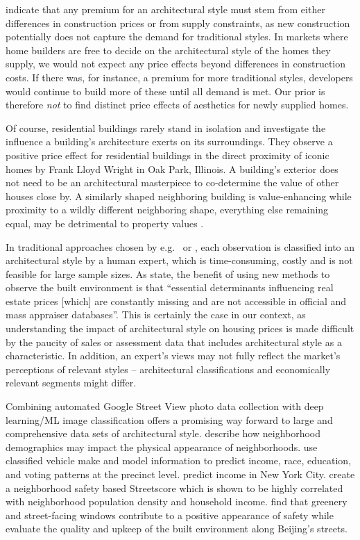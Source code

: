\documentclass[]{article}
\begin{document}
\textcite{Buitelaar2017} indicate that any premium for an architectural style must stem from either differences in construction prices or from supply
constraints, as new construction potentially does not capture the demand
for traditional styles. In markets where home builders are free to decide on the architectural style of the homes they supply, we would not expect any price effects beyond differences in construction costs. If there was, for instance, a premium for more traditional styles, developers would continue to build more of these until all demand is met. Our prior is therefore \emph{not} to find distinct price effects of aesthetics for newly supplied homes. 

Of course, residential buildings rarely stand in isolation and \textcite{Ahlfeldt2012} investigate the influence a building's architecture exerts on its surroundings. They observe a positive price effect for residential buildings in the direct proximity of iconic homes by Frank Lloyd Wright in Oak Park, Illinois. A building's exterior does not need to be an architectural masterpiece to co-determine the value of other houses close by. A similarly shaped neighboring building is value-enhancing while proximity to a wildly different neighboring shape, everything else remaining equal, may be detrimental to property values \autocite{Lindenthal2017b}. 

In traditional approaches chosen by e.g.~\textcite{Buitelaar2017} or \textcite{Ahlfeldt2012}, each observation is classified into an architectural style by a human expert, which is time-consuming, costly and is not feasible for large sample sizes. As \textcite{Helbich2013} state, the benefit of using new methods to observe the built environment is that ``essential determinants influencing real estate prices {[}which{]} are constantly missing and are not accessible in official and mass appraiser databases''. This is certainly the case in our context, as understanding the impact of architectural style on housing prices is made difficult by the paucity of sales or assessment data that includes architectural style as a characteristic. In addition, an expert's views may not fully reflect the market's perceptions of relevant styles -- architectural classifications and economically relevant segments might differ.

Combining automated Google Street View photo data collection with deep learning/ML image classification offers a promising way forward to large and comprehensive data sets of architectural style. \textcite{Naik2017} describe how neighborhood demographics may impact the physical appearance of neighborhoods. \textcite{Gebru2017} use classified vehicle make and model information to predict income, race, education, and voting patterns at the precinct level. \textcite{Glaeser2016} predict income in New York City. \textcite{Naik2016AER} create a neighborhood safety based Streetscore which is shown to be highly correlated with neighborhood population
density and household income. \textcite{Nadai2016} find that greenery
and street-facing windows contribute to a positive appearance of safety
while \textcite{Liu2017} evaluate the quality and upkeep of the built
environment along Beijing's streets. 
\end{document}
